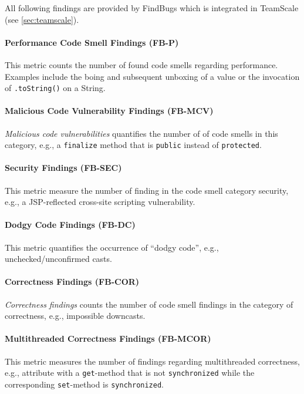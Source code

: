 \documentclass{scrartcl}
\begin{document}
All following findings are provided by FindBugs which is integrated in TeamScale
(see \ref{sec:teamscale}).

\paragraph{Performance Code Smell Findings (FB-P)}

This metric counts the number of found code smells regarding performance.
Examples include the boing and subsequent unboxing of a value or the invocation
of \texttt{.toString()} on a String.

\paragraph{Malicious Code Vulnerability Findings (FB-MCV)}

\emph{Malicious code vulnerabilities} quantifies the number of of code smells in
this category, e.g., a \texttt{finalize} method that is \texttt{public} instead
of \texttt{protected}.

\paragraph{Security Findings (FB-SEC)}

This metric measure the number of finding in the code smell category security,
e.g., a JSP-reflected cross-site scripting vulnerability.

\paragraph{Dodgy Code Findings (FB-DC)}

This metric quantifies the occurrence of \enquote{dodgy code}, e.g.,
unchecked/unconfirmed casts.

\paragraph{Correctness Findings (FB-COR)}

\emph{Correctness findings} counts the number of code smell findings in the
category of correctness, e.g., impossible downcasts.

\paragraph{Multithreaded Correctness Findings (FB-MCOR)}

This metric measures the number of findings regarding multithreaded correctness,
e.g., attribute with a \texttt{get}-method that is not \texttt{synchronized}
while the corresponding \texttt{set}-method is \texttt{synchronized}.
\end{document}
